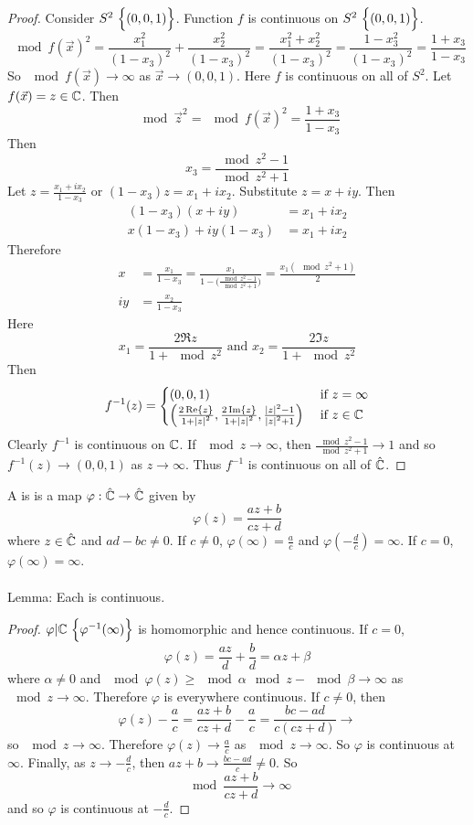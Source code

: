 \documentclass[12pt]{article}
\begin{document}
\begin{proof} Consider $S^2 \ \set{(0,0,1)}$. Function $f$ is continuous on $S^2 \ \set{(0,0,1)}$. $$ \mod{f(\vec{x})}^2 = \frac{x_1^2}{(1-x_3)^2} + \frac{x_2^2}{(1-x_3)^2} = \frac{x_1^2 + x_2^2}{(1-x_3)^2} = \frac{1-x_3^2}{(1-x_3)^2} = \frac{1+x_3}{1-x_3} $$ 
So $\mod{f(\vec{x})} \to \infty$ as $\vec{x} \to (0,0,1)$. Here $f$ is continuous on all of $S^2$. Let $f(\vec{x}) = z \in \mathbb{C}$. Then $$ \mod{\vec{z}}^2 = \mod{f(\vec{x})}^2 = \frac{1 + x_3}{1-x_3} $$ Then $$x_3 = \frac{\mod{z}^2 - 1}{\mod{z}^2 + 1} $$
Let $z = \frac{x_1 + ix_2}{1-x_3}$ or $(1-x_3)z = x_1 + ix_2$. Substitute $z = x + iy$. Then 
$$ \begin{aligned} (1-x_3)(x+iy) &= x_1 + ix_2 \\ x(1-x_3) + iy(1-x_3) &= x_1 + ix_2 \end{aligned} $$ Therefore $$ \begin{aligned} x &= \frac{x_1}{1-x_3} = \frac{x_1}{1 - \Big( \frac{\mod{z}^2 - 1}{\mod{z}^2 + 1}\Big)} = \frac{x_1(\mod{z}^2 + 1)}{2} \\ iy &= \frac{x_2}{1-x_3} \end{aligned} $$ 
Here $$x_1 = \frac{2\Re{z}}{1+\mod{z}^2} \text{ and } x_2 = \frac{2\Im{z}}{1 + \mod{z}^2} $$ 
Then $$ f^{-1}(z) = \begin{cases} (0,0,1) &\text{ if } z = \infty \\ \Big(\frac{2\Re{z}}{1+\abs{z}^2}, \frac{2\Im{z}}{1+\abs{z}^2}, \frac{\abs{z}^2 - 1}{\abs{z}^2 + 1}\Big) &\text{ if } z \in \mathbb{C} \end{cases} $$ Clearly $f^{-1}$ is continuous on $\mathbb{C}$. If $\mod{z} \to \infty$, then $\frac{\mod{z}^2 - 1}{\mod{z}^2 + 1} \to 1$ and so $f^{-1}(z) \to (0,0,1)$ as $z\to\infty$. Thus $f^{-1}$ is continuous on all of $\hat{\mathbb{C}}$. \end{proof} 
A \mobt is is a map $\varphi: \hat{\mathbb{C}} \to \hat{\mathbb{C}}$ given by $$\varphi(z) = \frac{az+b}{cz+d} $$ where $z \in \hat{\mathbb{C}}$ and $ad - bc \neq 0$. If $c \neq 0$, $\varphi(\infty) = \frac{a}{c}$ and $\varphi(-\frac{d}{c}) = \infty$. If $c=0$, $\varphi(\infty) = \infty$. \\~\\
Lemma: Each \mobt is continuous. 
\begin{proof} $\varphi| \complex \ \set{\varphi^{-1}(\infty)}$ is homomorphic and hence continuous. If $c=0$, $$ \varphi(z) = \frac{az}{d} + \frac{b}{d} = \alpha z + \beta$$ where $\alpha \neq 0$ and $\mod{\varphi(z)} \geq \mod{\alpha} \mod{z} - \mod{\beta} \to \infty$ as $\mod{z} \to \infty$. Therefore $\varphi$ is everywhere continuous. If $c \neq 0$, then $$\varphi(z) - \frac{a}{c} = \frac{az+b}{cz+d} - \frac{a}{c} = \frac{bc-ad}{c(cz+d)} \to $$ so $\mod{z} \to \infty$. Therefore $\varphi(z) \to \frac{a}{c}$ as $\mod{z} \to \infty$. So $\varphi$ is continuous at $\infty$. Finally, as $z \to -\frac{d}{c}$, then $az+b \to \frac{bc-ad}{c} \neq 0$. So $$\mod{\frac{az+b}{cz+d}} \to \infty$$ and so $\varphi$ is continuous at $-\frac{d}{c}$. \end{proof} 
\end{document}
